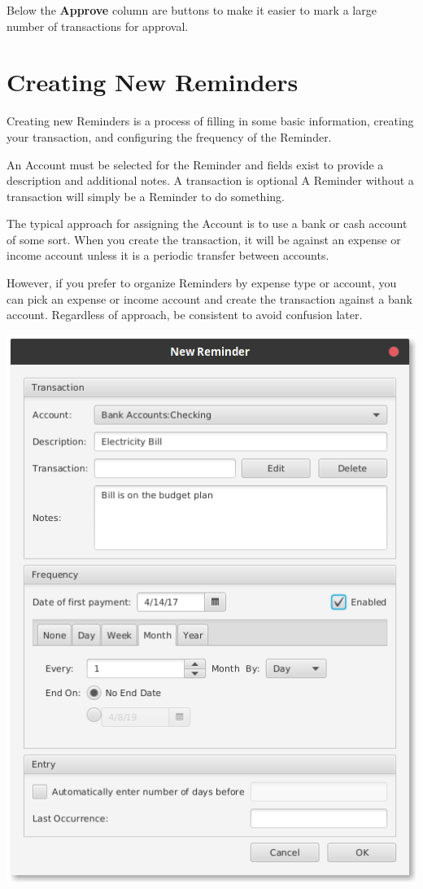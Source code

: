 \documentclass[letterpaper,12pt]{book}
\begin{document}
    Below the \textbf{Approve} column are buttons to make it easier to mark a large number of transactions for approval.

    \section{Creating New Reminders}

    Creating new Reminders is a process of filling in some basic information, creating your transaction, and configuring the
    frequency of the Reminder.

    An Account must be selected for the Reminder and fields exist to provide a description and additional notes.
    A transaction is optional
    A Reminder without a transaction will simply be a Reminder to do something.

    The typical approach for assigning the Account is to use a bank or cash account of some sort. When you create the
    transaction, it will be against an expense or income account unless it is a periodic transfer between accounts.

    However, if you prefer to organize Reminders by expense type or account, you can pick an expense or income
    account and create the transaction against a bank account.
    Regardless of approach, be consistent to avoid confusion later.

    \includegraphics[width=0.8\linewidth]{images/remindersNewDialog}
\end{document}
